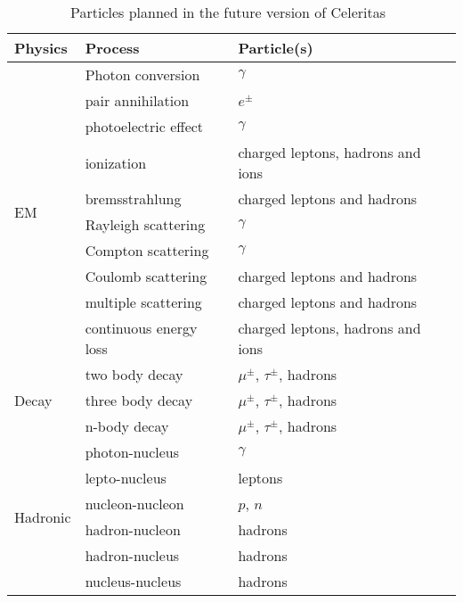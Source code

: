 \begin{table}[ht]
    \centering
    \begin{tabular}{lll}
        \hline
        \textbf{Physics}          & \textbf{Process}       & \textbf{Particle(s)}              \\
        \hline
        \multirow{10}{*}{EM}      & Photon conversion      & $\gamma$                          \\
                                & pair annihilation      & $e^\pm$                           \\
                                & photoelectric effect   & $\gamma$                          \\
                                & ionization             & charged leptons, hadrons and ions \\
                                & bremsstrahlung         & charged leptons and hadrons       \\
                                & Rayleigh scattering    & $\gamma$                          \\
                                & Compton scattering     & $\gamma$                          \\
                                & Coulomb scattering     & charged leptons and hadrons       \\
                                & multiple scattering    & charged leptons and hadrons       \\
                                & continuous energy loss & charged leptons, hadrons and ions \\
        \hline
        \multirow{3}{*}{Decay}    & two body decay         & $\mu^\pm$, $\tau^\pm$, hadrons    \\
                                & three body decay       & $\mu^\pm$, $\tau^\pm$, hadrons    \\
                                & n-body decay           & $\mu^\pm$, $\tau^\pm$, hadrons    \\
        \hline
        \multirow{6}{*}{Hadronic} & photon-nucleus         & $\gamma$                          \\
                                & lepto-nucleus          & leptons                           \\
                                & nucleon-nucleon        & $p$, $n$                          \\
                                & hadron-nucleon         & hadrons                           \\
                                & hadron-nucleus         & hadrons                           \\
                                & nucleus-nucleus        & hadrons                           \\
        \hline
    \end{tabular}
    \caption{Particles planned in the future version of Celeritas~\cite{exasclae-computing-ornl-evans}}
    \label{tab:analyze:atlas:particles:planned}
\end{table}


